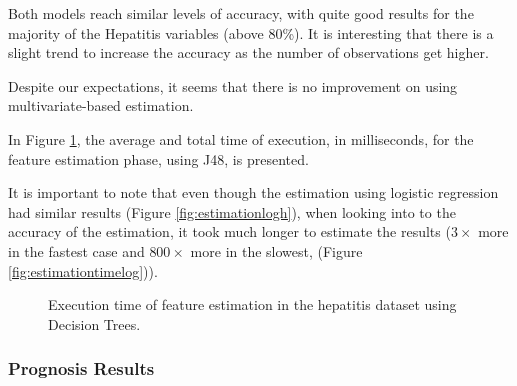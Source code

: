 Both models reach similar levels of accuracy, with quite good results for the majority of the Hepatitis variables
 (above 80\%). It is interesting that there is a slight trend to increase the accuracy as the number of observations get higher.

Despite our expectations, it seems that there is no improvement on using multivariate-based estimation.

In Figure \ref{fig:estimationtimetree}, the average and total time of execution, in milliseconds, for the feature estimation phase, using J48, is presented. 

It is important to note that even though the estimation using logistic regression had similar results (Figure \ref{fig:estimationlogh}),
 when looking into to the accuracy of the estimation, it took much longer to estimate the results
 ($3\times$ more in the fastest case and $800\times$ more in the slowest, (Figure \ref{fig:estimationtimelog})).

\begin{figure}[h]
	\begin{subfigmatrix}{2}
	\end{subfigmatrix}
	\caption{Execution time of feature estimation in the hepatitis dataset using Decision Trees.}
	\label{fig:estimationtimetree}
\end{figure}


\subsubsection{Prognosis Results}
\label{subsubsection:prognosis_dt}

